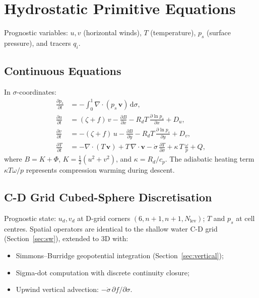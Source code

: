 \documentclass[11pt,twoside]{report}
\newcommand{\dd}{\mathrm{d}}
\newcommand{\pp}{\partial}
\newcommand{\half}{\tfrac{1}{2}}
\newcommand{\Rd}{R_d}
\newcommand{\cpd}{c_p}
\newcommand{\vect}[1]{\bm{#1}}
\newcommand{\divg}{\nabla\!\cdot\!}
\begin{document}
\section{Hydrostatic Primitive Equations}
\label{sec:pe}

Prognostic variables: $u,v$ (horizontal winds), $T$ (temperature),
$p_s$ (surface pressure), and tracers $q_i$.

\subsection{Continuous Equations}

In $\sigma$-coordinates:
\begin{align}
  \frac{\pp p_s}{\pp t} &= -\int_0^1 \divg(p_s\,\vect{v})\,\dd\sigma,
  \label{eq:pe-ps}\\
  \frac{\pp u}{\pp t} &= (\zeta+f)\,v - \frac{\pp B}{\pp x}
  - \Rd T\,\frac{\pp\ln p_s}{\pp x} + D_u,
  \label{eq:pe-u}\\
  \frac{\pp v}{\pp t} &= -(\zeta+f)\,u - \frac{\pp B}{\pp y}
  - \Rd T\,\frac{\pp\ln p_s}{\pp y} + D_v,
  \label{eq:pe-v}\\
  \frac{\pp T}{\pp t} &= -\divg(T\,\vect{v})+T\,\divg\vect{v}
  - \dot\sigma\,\frac{\pp T}{\pp\sigma}
  + \kappa\,T\,\frac{\omega}{p} + Q,
  \label{eq:pe-T}
\end{align}
where $B=K+\Phi$, $K=\half(u^2+v^2)$, and $\kappa=\Rd/\cpd$.
The adiabatic heating term $\kappa T\omega/p$ represents compression
warming during descent.

\subsection{C-D Grid Cubed-Sphere Discretisation}
\label{sec:pe-cdgrid}

Prognostic state: $u_d,v_d$ at D-grid corners $(6,n\!+\!1,n\!+\!1,N_{\mathrm{lev}})$;
$T$ and $p_s$ at cell centres.  Spatial operators are identical to the
shallow water C-D grid (Section~\ref{sec:sw}), extended to 3D with:
\begin{itemize}[nosep]
  \item Simmons--Burridge geopotential integration (Section~\ref{sec:vertical});
  \item Sigma-dot computation with discrete continuity closure;
  \item Upwind vertical advection: $-\dot\sigma\,\pp f/\pp\sigma$.
\end{itemize}
\end{document}
